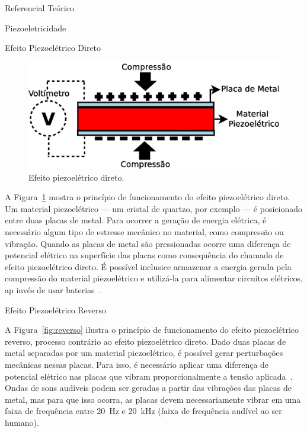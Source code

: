 \begin{chapter}{Referencial Teórico}
\begin{section}{Piezoeletricidade}
\begin{subsection}{Efeito Piezoelétrico Direto}
\begin{figure}[!h]
	\centering
	\begin{minipage}[c]{\textwidth}
	\centering
	\includegraphics[width=0.8\linewidth]{fig/EfeitoPiezoEletricoDireto}
	\caption{Efeito piezoelétrico direto.}
	\label{fig:direto}
	\end{minipage}
\end{figure}

A Figura~\ref{fig:direto} mostra o princípio de funcionamento do efeito
piezoelétrico direto. Um material piezoelétrico --- um cristal de quartzo, por
exemplo --- é posicionado entre duas placas de metal. Para ocorrer a geração de
energia elétrica, é necessário algum tipo de estresse mecânico no material, como
compressão ou vibração. Quando as placas de metal são pressionadas ocorre uma
diferença de potencial elétrico na superfície das placas como consequência do
chamado de efeito piezoelétrico direto.  É possível inclusice armazenar a
energia gerada pela compressão do material piezoelétrico e utilizá-la para
alimentar circuitos elétricos, ap invés de usar baterias~\cite{twitter}. 

\end{subsection}


\begin{subsection}{Efeito Piezoelétrico Reverso}

A Figura~\ref{fig:reverso} ilustra o princípio de funcionamento do efeito
piezoelétrico reverso, processo contrário ao efeito piezoelétrico direto. Dado
duas placas de metal separadas por um material piezoelétrico, é possível gerar
perturbações mecânicas nessas placas. Para isso, é necessário aplicar uma
diferença de potencial elétrico nas placas que vibram proporcionalmente a tensão
aplicada~\cite{Lin12}. Ondas de sons audíveis podem ser geradas a partir das
vibrações das placas de metal, mas para que isso ocorra, as placas devem
necessariamente vibrar em uma faixa de frequência entre 20~Hz e 20~kHz (faixa de
frequência audível ao ser humano).



\end{subsection}
\end{section}
\end{chapter}
